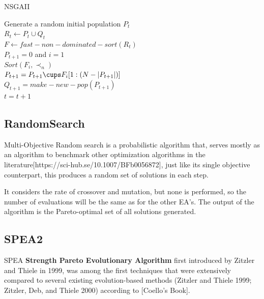 \begin{algorithm}[H]
\label{nsgaii_alg}
\caption{NSGAII}
\SetAlgoLined
Generate a random initial population $P_t$\;\\
$R_t \gets P_t \cup Q_t$ \;\\
$F \gets fast-non-dominated-sort(R_t)$ \;\\
$P_{t+1} = 0$ and $i = 1$\;\\
$Sort(F_i, \prec_n)$\;\\
$P_{t+1} = P_{t+1} \cups F_i[1:(N-|P_{t+1}|)]$\;\\
$Q_{t+1} = make-new-pop(P_{t+1})$\;\\
$t = t+1$\;\\
\end{algorithm}


\subsection{RandomSearch}

Multi-Objective Random search is a probabilistic algorithm that, serves mostly as an algorithm to benchmark other optimization algorithms in the literature[https://sci-hub.se/10.1007/BFb0056872], just like its single objective counterpart, this produces a random set of solutions in each step. 

It considers the rate of crossover and mutation, but none is performed, so the number of evaluations will be the same as for the other EA's. The output of the algorithm is the Pareto-optimal set of all solutions generated.

\subsection{SPEA2}

SPEA \textbf{Strength Pareto Evolutionary Algorithm} first introduced by Zitzler and Thiele in 1999, was among the first techniques that were extensively compared to several existing evolution-based methods (Zitzler
and Thiele 1999; Zitzler, Deb, and Thiele 2000) according to [Coello's Book].

